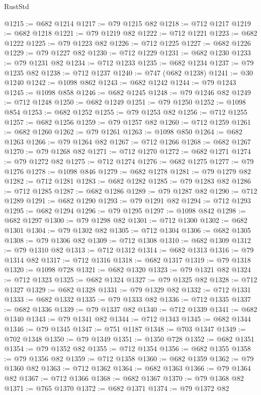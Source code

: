 \begin{lexlean}{RustStd}
\begin{coremodule}
{\begin{coremodule}
{{{{{{{{{{{{{{{{{{{{{{{{{{{{{{{@1215 := @682 @1214
@1217 := @79 @1215 @82
@1218 := @712 @1217
@1219 := @682 @1218
@1221 := @79 @1219 @82
@1222 := @712 @1221
@1223 := @682 @1222
@1225 := @79 @1223 @82
@1226 := @712 @1225
@1227 := @682 @1226
@1229 := @79 @1227 @82
@1230 := @712 @1229
@1231 := @682 @1230
@1233 := @79 @1231 @82
@1234 := @712 @1233
@1235 := @682 @1234
@1237 := @79 @1235 @82
@1238 := @712 @1237
@1240 := @747 (@682 @1238)
@1241 := @30 @1240
@1242 := @1098 @862
@1243 := @682 @1242
@1244 := @79 @1243
@1245 := @1098 @858
@1246 := @682 @1245
@1248 := @79 @1246 @82
@1249 := @712 @1248
@1250 := @682 @1249
@1251 := @79 @1250
@1252 := @1098 @854
@1253 := @682 @1252
@1255 := @79 @1253 @82
@1256 := @712 @1255
@1257 := @682 @1256
@1259 := @79 @1257 @82
@1260 := @712 @1259
@1261 := @682 @1260
@1262 := @79 @1261
@1263 := @1098 @850
@1264 := @682 @1263
@1266 := @79 @1264 @82
@1267 := @712 @1266
@1268 := @682 @1267
@1270 := @79 @1268 @82
@1271 := @712 @1270
@1272 := @682 @1271
@1274 := @79 @1272 @82
@1275 := @712 @1274
@1276 := @682 @1275
@1277 := @79 @1276
@1278 := @1098 @846
@1279 := @682 @1278
@1281 := @79 @1279 @82
@1282 := @712 @1281
@1283 := @682 @1282
@1285 := @79 @1283 @82
@1286 := @712 @1285
@1287 := @682 @1286
@1289 := @79 @1287 @82
@1290 := @712 @1289
@1291 := @682 @1290
@1293 := @79 @1291 @82
@1294 := @712 @1293
@1295 := @682 @1294
@1296 := @79 @1295
@1297 := @1098 @842
@1298 := @682 @1297
@1300 := @79 @1298 @82
@1301 := @712 @1300
@1302 := @682 @1301
@1304 := @79 @1302 @82
@1305 := @712 @1304
@1306 := @682 @1305
@1308 := @79 @1306 @82
@1309 := @712 @1308
@1310 := @682 @1309
@1312 := @79 @1310 @82
@1313 := @712 @1312
@1314 := @682 @1313
@1316 := @79 @1314 @82
@1317 := @712 @1316
@1318 := @682 @1317
@1319 := @79 @1318
@1320 := @1098 @728
@1321 := @682 @1320
@1323 := @79 @1321 @82
@1324 := @712 @1323
@1325 := @682 @1324
@1327 := @79 @1325 @82
@1328 := @712 @1327
@1329 := @682 @1328
@1331 := @79 @1329 @82
@1332 := @712 @1331
@1333 := @682 @1332
@1335 := @79 @1333 @82
@1336 := @712 @1335
@1337 := @682 @1336
@1339 := @79 @1337 @82
@1340 := @712 @1339
@1341 := @682 @1340
@1343 := @79 @1341 @82
@1344 := @712 @1343
@1345 := @682 @1344
@1346 := @79 @1345
@1347 := @751 @1187
@1348 := @703 @1347
@1349 := @702 @1348
@1350 := @79 @1349
@1351 := @1350 @728
@1352 := @682 @1351
@1354 := @79 @1352 @82
@1355 := @712 @1354
@1356 := @682 @1355
@1358 := @79 @1356 @82
@1359 := @712 @1358
@1360 := @682 @1359
@1362 := @79 @1360 @82
@1363 := @712 @1362
@1364 := @682 @1363
@1366 := @79 @1364 @82
@1367 := @712 @1366
@1368 := @682 @1367
@1370 := @79 @1368 @82
@1371 := @765 @1370
@1372 := @682 @1371
@1374 := @79 @1372 @82
}}}}}}}}}}}}}}}}}}}}}}}}}}}}}}}
\end{coremodule}}
\end{coremodule}
\end{lexlean}
